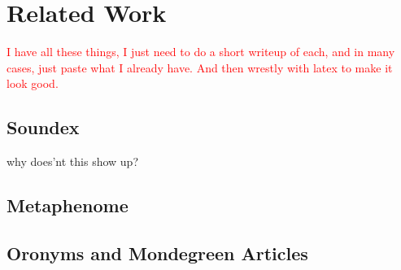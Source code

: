 \chapter{Related Work}

\textcolor{Red}{ I have all these things, I just need to do a short writeup of each, and in many cases, just paste what I already have. And then wrestly with latex to make it look good.}

\section{Soundex}
why does'nt this show up?

\section{Metaphenome}

\section{Oronyms and Mondegreen Articles}


